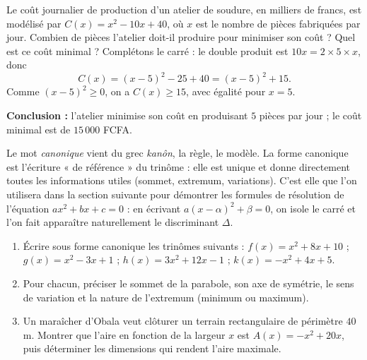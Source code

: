 \documentclass[11pt]{article}
\begin{document}
\begin{exoresolu}
Le coût journalier de production d'un atelier de soudure, en milliers de francs, est modélisé par $C(x) = x^2 - 10x + 40$, où $x$ est le nombre de pièces fabriquées par jour. Combien de pièces l'atelier doit-il produire pour minimiser son coût ? Quel est ce coût minimal ?
\tcblower
Complétons le carré : le double produit est $10x = 2 \times 5 \times x$, donc
\[ C(x) = (x-5)^2 - 25 + 40 = (x-5)^2 + 15. \]
Comme $(x-5)^2 \geq 0$, on a $C(x) \geq 15$, avec égalité pour $x = 5$.

\textbf{Conclusion :} l'atelier minimise son coût en produisant $5$ pièces par jour ; le coût minimal est de $15\,000$ FCFA.
\end{exoresolu}

\begin{savaistu}
Le mot \emph{canonique} vient du grec \emph{kanôn}, la règle, le modèle. La forme canonique est l'écriture « de référence » du trinôme : elle est unique et donne directement toutes les informations utiles (sommet, extremum, variations). C'est elle que l'on utilisera dans la section suivante pour démontrer les formules de résolution de l'équation $ax^2+bx+c=0$ : en écrivant $a(x-\alpha)^2 + \beta = 0$, on isole le carré et l'on fait apparaître naturellement le discriminant $\Delta$.
\end{savaistu}

\begin{exercice}
\begin{enumerate}
\item Écrire sous forme canonique les trinômes suivants : $f(x) = x^2 + 8x + 10$ ; $g(x) = x^2 - 3x + 1$ ; $h(x) = 3x^2 + 12x - 1$ ; $k(x) = -x^2 + 4x + 5$.
\item Pour chacun, préciser le sommet de la parabole, son axe de symétrie, le sens de variation et la nature de l'extremum (minimum ou maximum).
\item Un maraîcher d'Obala veut clôturer un terrain rectangulaire de périmètre $40$ m. Montrer que l'aire en fonction de la largeur $x$ est $A(x) = -x^2 + 20x$, puis déterminer les dimensions qui rendent l'aire maximale.
\end{enumerate}
\end{exercice}
\end{document}
